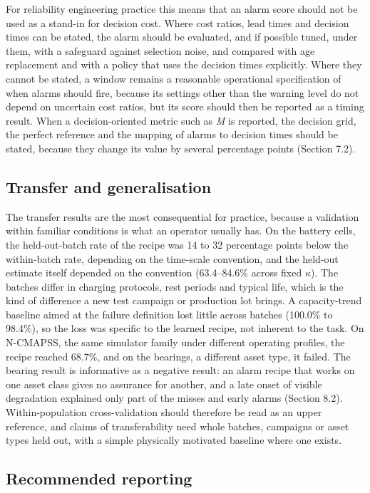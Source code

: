 \documentclass[a4paper,fleqn,doubleblind]{cas-dc}
\begin{document}
For reliability engineering practice this means that an alarm score should not be used as a stand-in for decision cost. Where cost ratios, lead times and decision times can be stated, the alarm should be evaluated, and if possible tuned, under them, with a safeguard against selection noise, and compared with age replacement and with a policy that uses the decision times explicitly. Where they cannot be stated, a window remains a reasonable operational specification of when alarms should fire, because its settings other than the warning level do not depend on uncertain cost ratios, but its score should then be reported as a timing result. When a decision-oriented metric such as \textit{M} is reported, the decision grid, the perfect reference and the mapping of alarms to decision times should be stated, because they change its value by several percentage points (Section 7.2).

\subsection{Transfer and generalisation}

The transfer results are the most consequential for practice, because a validation within familiar conditions is what an operator usually has. On the battery cells, the held-out-batch rate of the recipe was 14 to 32 percentage points below the within-batch rate, depending on the time-scale convention, and the held-out estimate itself depended on the convention (63.4--84.6\% across fixed $\kappa$). The batches differ in charging protocols, rest periods and typical life, which is the kind of difference a new test campaign or production lot brings. A capacity-trend baseline aimed at the failure definition lost little across batches (100.0\% to 98.4\%), so the loss was specific to the learned recipe, not inherent to the task. On N-CMAPSS, the same simulator family under different operating profiles, the recipe reached 68.7\%, and on the bearings, a different asset type, it failed. The bearing result is informative as a negative result: an alarm recipe that works on one asset class gives no assurance for another, and a late onset of visible degradation explained only part of the misses and early alarms (Section 8.2). Within-population cross-validation should therefore be read as an upper reference, and claims of transferability need whole batches, campaigns or asset types held out, with a simple physically motivated baseline where one exists.

\subsection{Recommended reporting}
\end{document}
